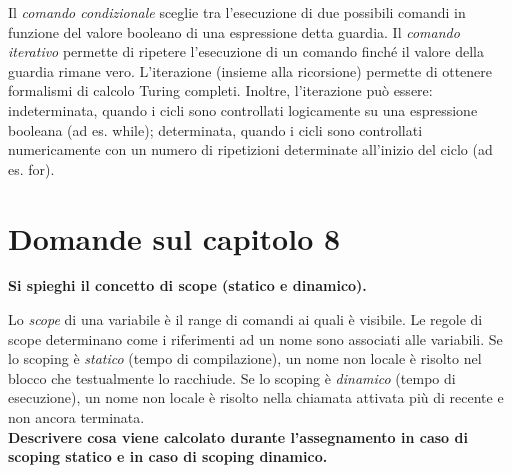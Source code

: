 \documentclass[a4paper,oneside,titlepage]{book}
\begin{document}
Il \emph{comando condizionale} sceglie tra l'esecuzione di due possibili comandi in funzione del valore booleano di una espressione detta guardia. Il \emph{comando iterativo} permette di ripetere l'esecuzione di un comando finché il valore della guardia rimane vero. L'iterazione (insieme alla ricorsione) permette di ottenere formalismi di calcolo Turing completi. Inoltre, l'iterazione può essere: indeterminata, quando i cicli sono controllati logicamente su una espressione booleana (ad es. while); determinata, quando i cicli sono controllati numericamente con un numero di ripetizioni determinate all'inizio del ciclo (ad es. for).

\section{Domande sul capitolo 8}
\textbf{Si spieghi il concetto di scope (statico e dinamico).}

Lo \emph{scope} di una variabile è il range di comandi ai quali è visibile. Le regole di scope determinano come i riferimenti ad un nome sono associati alle variabili. Se lo scoping è \emph{statico} (tempo di compilazione), un nome non locale è risolto nel blocco che testualmente lo racchiude. Se lo scoping è \emph{dinamico} (tempo di esecuzione), un nome non locale è risolto nella chiamata attivata più di recente e non ancora terminata.
\bigskip
\\
\textbf{Descrivere cosa viene calcolato durante l'assegnamento in caso di scoping statico e in caso di scoping dinamico.}
\end{document}
